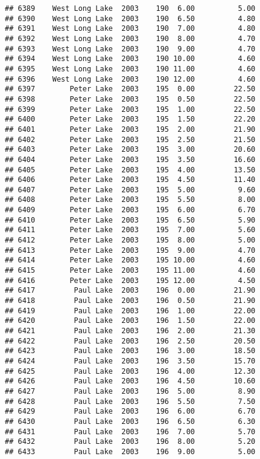 \documentclass[
]{article}
\begin{document}
\begin{verbatim}
## 6389    West Long Lake  2003    190  6.00          5.00
## 6390    West Long Lake  2003    190  6.50          4.80
## 6391    West Long Lake  2003    190  7.00          4.80
## 6392    West Long Lake  2003    190  8.00          4.70
## 6393    West Long Lake  2003    190  9.00          4.70
## 6394    West Long Lake  2003    190 10.00          4.60
## 6395    West Long Lake  2003    190 11.00          4.60
## 6396    West Long Lake  2003    190 12.00          4.60
## 6397        Peter Lake  2003    195  0.00         22.50
## 6398        Peter Lake  2003    195  0.50         22.50
## 6399        Peter Lake  2003    195  1.00         22.50
## 6400        Peter Lake  2003    195  1.50         22.20
## 6401        Peter Lake  2003    195  2.00         21.90
## 6402        Peter Lake  2003    195  2.50         21.50
## 6403        Peter Lake  2003    195  3.00         20.60
## 6404        Peter Lake  2003    195  3.50         16.60
## 6405        Peter Lake  2003    195  4.00         13.50
## 6406        Peter Lake  2003    195  4.50         11.40
## 6407        Peter Lake  2003    195  5.00          9.60
## 6408        Peter Lake  2003    195  5.50          8.00
## 6409        Peter Lake  2003    195  6.00          6.70
## 6410        Peter Lake  2003    195  6.50          5.90
## 6411        Peter Lake  2003    195  7.00          5.60
## 6412        Peter Lake  2003    195  8.00          5.00
## 6413        Peter Lake  2003    195  9.00          4.70
## 6414        Peter Lake  2003    195 10.00          4.60
## 6415        Peter Lake  2003    195 11.00          4.60
## 6416        Peter Lake  2003    195 12.00          4.50
## 6417         Paul Lake  2003    196  0.00         21.90
## 6418         Paul Lake  2003    196  0.50         21.90
## 6419         Paul Lake  2003    196  1.00         22.00
## 6420         Paul Lake  2003    196  1.50         22.00
## 6421         Paul Lake  2003    196  2.00         21.30
## 6422         Paul Lake  2003    196  2.50         20.50
## 6423         Paul Lake  2003    196  3.00         18.50
## 6424         Paul Lake  2003    196  3.50         15.70
## 6425         Paul Lake  2003    196  4.00         12.30
## 6426         Paul Lake  2003    196  4.50         10.60
## 6427         Paul Lake  2003    196  5.00          8.90
## 6428         Paul Lake  2003    196  5.50          7.50
## 6429         Paul Lake  2003    196  6.00          6.70
## 6430         Paul Lake  2003    196  6.50          6.30
## 6431         Paul Lake  2003    196  7.00          5.70
## 6432         Paul Lake  2003    196  8.00          5.20
## 6433         Paul Lake  2003    196  9.00          5.00

\end{verbatim}
\end{document}
